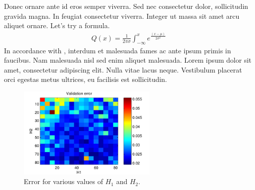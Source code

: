 \documentclass[12pt,a4paper,oneside]{paper} %
\begin{document}
Donec ornare ante id eros semper viverra. Sed nec consectetur dolor,
sollicitudin gravida magna. In feugiat consectetur viverra. Integer ut massa sit
amet arcu aliquet ornare. Let's try a formula.
\begin{align*}
Q(x) = \frac{1}{2 \pi \sigma} \int_{- \infty}^{x} e^{\tfrac{(x - \mu)}{2
\sigma^2}}
\end{align*}
In accordance with \citet[p.~185]{seeger2013pattern}, interdum et malesuada
fames ac ante ipsum primis in faucibus. Nam malesuada nisl sed enim aliquet
malesuada.  Lorem ipsum dolor sit amet, consectetur adipiscing elit. Nulla vitae
lacus neque. Vestibulum placerat orci egestas metus ultrices, eu facilisis est
sollicitudin.

\begin{figure}[ht]
  \centering
  \includegraphics[width=0.6\textwidth]{fig.pdf}
  \caption{Error for various values of $H_1$ and $H_2$.}
  \label{fig:example}
\end{figure}


\end{document}
